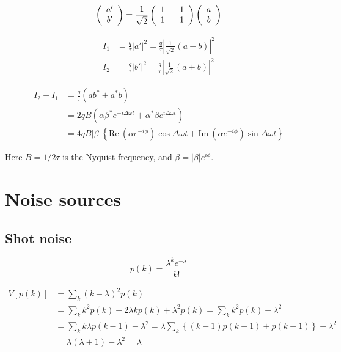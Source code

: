 \documentclass{book}
\begin{document}
\begin{equation}
  \left( \begin{array}{c}
  	a' \\ b'
  \end{array}
  \right) =
  \frac{1}{\sqrt 2}\left( \begin{array}{r r} 
  	1 & -1 \\ 1 & 1
 \end{array}
	\right)
	\left( \begin{array}{c}
		a \\ b
	\end{array} \right)
	\label{eq:beamsplitter_matrix}
\end{equation}

\begin{equation}
\begin{aligned}
  I_1 &= \frac q \tau |a'|^2 = \frac{q}{\tau}\left|\frac{1}{\sqrt 2} (a - b)\right|^2\\
  I_2 &= \frac q \tau |b'|^2 = \frac{q}{\tau}\left|\frac{1}{\sqrt 2} (a + b)\right|^2
\end{aligned}
\end{equation}

\begin{equation}
\begin{aligned}
  I_2 - I_1 &= \frac{q}{\tau}(ab^* + a^* b)\\
  &= 2qB(\alpha \beta^* e^{-i\Delta\omega t} + \alpha^* \beta e^{i\Delta\omega t})\\
  &= 4qB|\beta|\left\{\mathrm{Re} \  (\alpha e^{-i\phi}) \cos \Delta \omega t + \mathrm{Im} \ (\alpha e^{-i\phi}) \sin \Delta \omega t\right\}
\end{aligned}\label{eq:output_of_balanced_detector}
\end{equation}

Here $B = 1/2\tau$ is the Nyquist frequency, and $\beta = |\beta|e^{i\phi}$.


\section{Noise sources}
\subsection{Shot noise}
\begin{equation}
	p(k) = \frac{\lambda^k e^{-\lambda}}{k!}
\end{equation}

\begin{equation}
\begin{aligned}
	V[p(k)] &= \sum_k{(k-\lambda)^2}p(k)\\
	&= \sum_k{k^2 p(k) - 2\lambda k p(k) + \lambda^2 p(k)} = \sum_k{k^2 p(k) - \lambda^2} \\
	&=\sum_k{k\lambda p(k-1) - \lambda^2} = \lambda\sum_k{\left\{ (k-1)p(k-1) + p(k-1)\right\}}-\lambda^2 \\
	&= \lambda(\lambda + 1) - \lambda^2 = \lambda
\end{aligned}
\end{equation}
\end{document}

